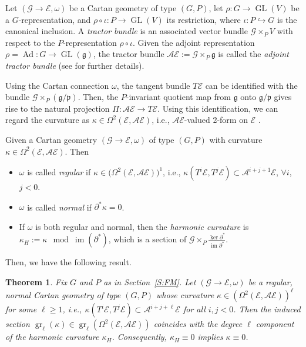 \documentclass[10pt,a4paper]{amsart}
\DeclareMathOperator{\gr}{gr}
\DeclareMathOperator{\img}{im}
\newcommand\GL{\operatorname{GL}}
\newcommand{\g}{\mathfrak{g}}
\newcommand\cG{\mathcal{G}}
\newcommand\Ad{\operatorname{Ad}}
\renewcommand\gr{\operatorname{gr}}
\newcommand\fp{\mathfrak{p}}
\newcommand\cA{\mathcal{A}}
\newcommand\cE{\mathcal{E}}
\numberwithin{equation}{section}
\newtheorem{Theorem}{Theorem}[section]
\begin{document}
\begin{Definition}
Let $(\cG \to \cE, \omega)$ be a Cartan geometry of type $(G,P)$, let $\rho\colon G \to \GL(V)$ be a $G$-representation, and $\rho \circ\iota\colon P \to \GL(V)$ its restriction, where $\iota \colon P \hookrightarrow G$ is the canonical inclusion. A {\em tractor bundle} is an associated vector bundle $\cG \times_P V$ with respect to the $P$-representation $\rho \circ \iota$. Given the adjoint representation $\rho = \Ad\colon G \to \GL(\g)$, the tractor bundle $\cA \cE := \cG \times_P \g$ is called the {\em adjoint tractor bundle} (see \cite[Section~1.5.7]{CS2009} for further details).
\end{Definition}

Using the Cartan connection $\omega$, the tangent bundle $T\cE$ can be identified with the bundle $\cG \times_P (\g/\fp) $. Then, the $P$-invariant quotient map from $\g$ onto $\g /\fp$ gives rise to the natural projection $\Pi\colon \cA \cE \to T\cE$. Using this identification, we can regard the curvature as $\kappa \in \Omega^2(\cE, \cA \cE)$, i.e., $\cA\cE$-valued 2-form on $\cE$ \cite[Proposition~1.5.7]{CS2009}.

\begin{Definition} \label{D:RN}
Given a Cartan geometry $(\cG \to \cE, \omega)$ of type $(G,P)$ with curvature $\kappa \in \Omega^2(\cE, \cA \cE)$. Then
\begin{itemize}\itemsep=0pt
\item [(a)] $\omega$ is called {\em regular} if $\kappa \in \bigl(\Omega^2(\cE, \cA \cE)\bigr)^1$, i.e., $\kappa(T^i\cE, T^j\cE) \subset \cA^{i+j+1}\cE$, $\forall i$, $j < 0$.
\item [(b)] $\omega$ is called {\it normal} if $\partial^\ast \kappa = 0$.
\item [(c)] If $\omega$ is both regular and normal, then the {\em harmonic curvature} is $\kappa_H := \kappa \mod \img(\partial^*)$, which is a section of $\cG \times_P \frac{\ker \partial^*}{\img \partial^*}$.
\end{itemize}
\end{Definition}
Then, we have the following result.

\begin{Theorem} \label{T:lh}
Fix $G$ and $P$ as in Section~{\rm \ref{S:FM}}. Let $(\cG \to \cE, \omega)$ be a regular, normal Cartan geometry of type $(G,P)$ whose curvature $\kappa \in \left(\Omega^2(\cE,\cA \cE)\right)^\ell$ for some $\ell \ge 1$, i.e., $\kappa \left(T^i\cE, T^j\cE\right) \subset \cA^{i+j+\ell}\cE$ for all $i,j <0$. Then the induced section $\gr_\ell (\kappa) \in \gr_\ell \left(\Omega^2(\cE,\cA \cE)\right)$ coincides with the degree $\ell$ component of the harmonic curvature $\kappa_H$. Consequently, $\kappa_H \equiv 0$ implies $\kappa \equiv 0$.
\end{Theorem}
\end{document}
